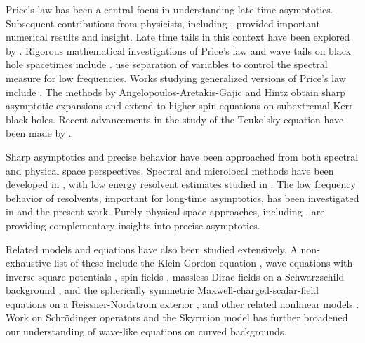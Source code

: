 \documentclass[10pt,a4paper,reqno]{amsart}
\theoremstyle{definition}
\theoremstyle{remark}
\numberwithin{equation}{section}
\begin{document}
Price's law \cite{Price} has been a central focus in understanding late-time asymptotics. Subsequent contributions from physicists, including \cite{Gundlach1994a,Gundlach1994b}, provided important numerical results and insight. Late time tails in this context have been explored by \cite{Bizon2007b,Bizon2009a,Bizon2009b,Bizon2010,Szpak2008,Szpak2009}. Rigorous mathematical investigations of Price's law and wave tails on black hole spacetimes include \cite{Angelopoulos2018,Angelopoulos2021a,Angelopoulos2021b,DafermosRodnianski2005,MTT,Tataru2013,Hin22,MaZhang2023TAMS,LooiTohaneanu}. \cite{Donninger2011,Donninger2012,FinsterKamranSmollerYau2006} use separation of variables to control the spectral measure for low frequencies. Works studying generalized versions of Price's law include \cite{Looi21,MW23}. The methods by Angelopoulos-Aretakis-Gajic \cite{Angelopoulos2018,Angelopoulos2021a,Angelopoulos2021b} and Hintz \cite{Hin22} obtain sharp asymptotic expansions and extend to higher spin equations on subextremal Kerr black holes. Recent advancements in the study of the Teukolsky equation have been made by \cite{MaZhang2023CMP,Millet,Shlapentokh-Rothman2020a,Shlapentokh-Rothman2023}.


Sharp asymptotics and precise behavior have been approached from both spectral and physical space perspectives. Spectral and microlocal methods have been developed in \cite{Baskin2015,Baskin2018,Dyatlov2015,Hintz2023,Hintz2023b,Millet,VasyMicroKerrdS,Hintz2023a,Haefner2021}, with low energy resolvent estimates studied in \cite{BH,GuillarmouHassell2008,GuillarmouHassell2009,GuillarmouHassellSikora2013,VasyLowEnergyRiemannian}. The low frequency behavior of resolvents, important for long-time asymptotics, has been investigated in \cite{BH,VasyLowEnergyRiemannian,VasyLowEnergyLag,Sussman} and the present work. Purely physical space approaches, including \cite{LukOh,Luk2015,LukOh2}, are providing complementary insights into precise asymptotics.

Related models and equations have also been studied extensively. A non-exhaustive list of these include the Klein-Gordon equation \cite{Gajic2024,Pasqualotto2023,Sussman2023,Shlapentokh-Rothman2024}, wave equations with inverse-square potentials \cite{Gajic2023,Baskin2022,Hintz2023}, spin fields \cite{Ma2022b}, massless Dirac fields on a Schwarzschild background \cite{Ma2022c}, and the spherically symmetric Maxwell-charged-scalar-field equations on a Reissner-Nordström exterior \cite{Van2022}, and other related nonlinear models \cite{Dafermos2022}. Work on Schrödinger operators \cite{Sussman,LooiSussman} and the Skyrmion model \cite{Bizon2007a} has further broadened our understanding of wave-like equations on curved backgrounds.
\end{document}
